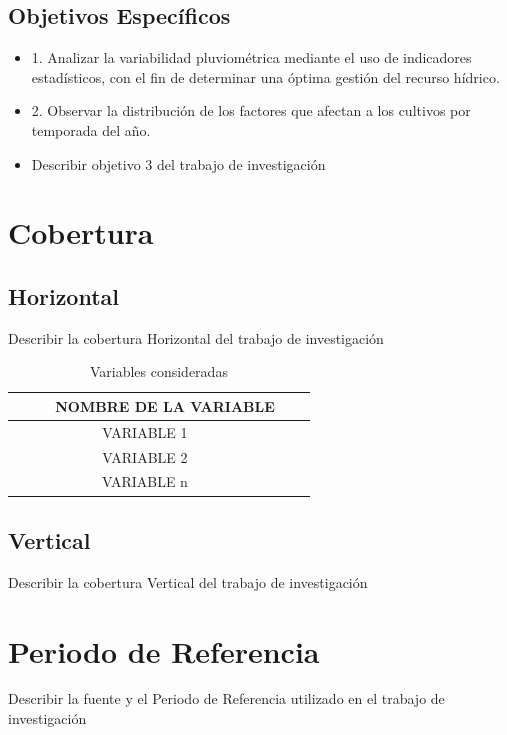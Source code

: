 \documentclass[oneside,11pt]{Latex/Classes/PhDthesisPSnPDF}
\begin{document}
\subsection{Objetivos Específicos}
\begin{itemize}
  \item{1.      Analizar la variabilidad pluviométrica mediante el uso de indicadores estadísticos, con el fin de determinar una óptima gestión del recurso hídrico.}
  \item{2.      Observar la distribución de los factores que afectan a los cultivos por temporada del año.}
  \item{Describir objetivo 3 del trabajo de investigación}
\end{itemize}

\section{Cobertura}

\subsection{Horizontal}

Describir la cobertura Horizontal del trabajo de investigación\\

\begin{table}[ht]
\centering
\caption{Variables consideradas} 
\resizebox{10cm}{!} {
\begin{tabular}{ccc}
  \hline
\ \ \ \ \ NOMBRE DE LA VARIABLE \\ 
  \hline
   VARIABLE 1 \\ 
VARIABLE 2\\ 
VARIABLE n\\ 
   \hline
\end{tabular}
}
\end{table}

\subsection{Vertical}

Describir la cobertura Vertical del trabajo de investigación

\section{Periodo de Referencia}

Describir la fuente y el Periodo de Referencia utilizado en el trabajo
de investigación
\end{document}
